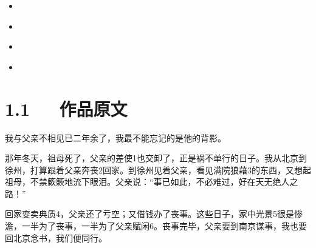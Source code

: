 \documentclass[letterpaper,12pt,english]{sphinxmanual}
\begin{document}
\begin{sphinxShadowBox}
\begin{itemize}
\begin{itemize}
\begin{itemize}
\item {} 
\label{\detokenize{p01_u6563_u6587/_u6731_u81ea_u6e05-_u80cc_u5f71:id21}}{\hyperref[\detokenize{p01_u6563_u6587/_u6731_u81ea_u6e05-_u80cc_u5f71:id9}]{}}

\end{itemize}

\item {} 
\label{\detokenize{p01_u6563_u6587/_u6731_u81ea_u6e05-_u80cc_u5f71:id22}}{\hyperref[\detokenize{p01_u6563_u6587/_u6731_u81ea_u6e05-_u80cc_u5f71:id10}]{}}

\item {} 
\label{\detokenize{p01_u6563_u6587/_u6731_u81ea_u6e05-_u80cc_u5f71:id23}}{\hyperref[\detokenize{p01_u6563_u6587/_u6731_u81ea_u6e05-_u80cc_u5f71:id11}]{}}

\item {} 
\label{\detokenize{p01_u6563_u6587/_u6731_u81ea_u6e05-_u80cc_u5f71:id24}}{\hyperref[\detokenize{p01_u6563_u6587/_u6731_u81ea_u6e05-_u80cc_u5f71:id12}]{}}

\item {} 
\label{\detokenize{p01_u6563_u6587/_u6731_u81ea_u6e05-_u80cc_u5f71:id25}}{\hyperref[\detokenize{p01_u6563_u6587/_u6731_u81ea_u6e05-_u80cc_u5f71:id13}]{}}

\end{itemize}

\end{itemize}
\end{sphinxShadowBox}


\section{1.1   作品原文}
\label{\detokenize{p01_u6563_u6587/_u6731_u81ea_u6e05-_u80cc_u5f71:id3}}
我与父亲不相见已二年余了，我最不能忘记的是他的背影。

那年冬天，祖母死了，父亲的差使1也交卸了，正是祸不单行的日子。我从北京到徐州，打算跟着父亲奔丧2回家。到徐州见着父亲，看见满院狼藉3的东西，又想起祖母，不禁簌簌地流下眼泪。父亲说：“事已如此，不必难过，好在天无绝人之路！”

回家变卖典质4，父亲还了亏空；又借钱办了丧事。这些日子，家中光景5很是惨澹，一半为了丧事，一半为了父亲赋闲6。丧事完毕，父亲要到南京谋事，我也要回北京念书，我们便同行。
\end{document}
